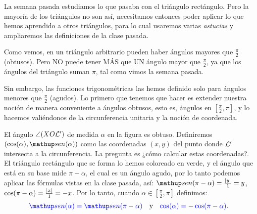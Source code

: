 La semana pasada estudiamos lo que pasaba con el triángulo rectángulo.
Pero la mayoría de los triángulos no son así, necesitamos entonces poder aplicar lo que hemos aprendido a otros triángulos, para lo cual usaremos varias \emph{astucias} y ampliaremos las definiciones de la clase pasada.
\begin{center}
\end{center}
Como vemos, en un triángulo arbitrario pueden haber ángulos mayores que $\frac{\pi}{2}$ (obtusos).
Pero NO puede tener MÁS que UN ángulo mayor que $\frac{\pi}{2}$, ya que los ángulos del triángulo suman $\pi$, tal como vimos la semana pasada.

Sin embargo, las funciones trigonométricas las hemos definido solo para ángulos menores que $\frac{\pi}{2}$ (agudos).
Lo primero que tenemos que hacer es extender nuestra noción de manera conveniente a ángulos obtusos, esto es, ángulos en $[\frac{\pi}{2},\pi]$, y lo hacemos valiéndonos de la circunferencia unitaria y la noción de coordenada.

El ángulo $\angle(X O \mathcal{L}')$ de medida $\alpha$ en la figura es obtuso.
Definiremos $(\cos(\alpha),\sen(\alpha))$ como las coordenadas $(x,y)$ del punto donde $\mathcal{L}'$ intersecta a la circunferencia.
La pregunta es ¿cómo calcular estas coordenadas?.
El triángulo rectángulo que se forma lo hemos coloreado en verde, y el ángulo que está en su base mide $\pi-\alpha$, el cual es un ángulo agudo, por lo tanto podemos aplicar las fórmulas vistas en la clase pasada, así: $\sen(\pi-\alpha)=\frac{|y|}{1}=y$, $\textup{cos}(\pi-\alpha)=\frac{|x|}{1}=-x$. 
Por lo tanto, cuando $\alpha\in[\frac{\pi}{2},\pi]$ definimos:
$$\color{blue}{\sen(\alpha)=\sen(\pi-\alpha)}\quad \color{black}{\textup{y}}\quad \color{blue}{\cos(\alpha)=-\cos(\pi-\alpha)}.$$



